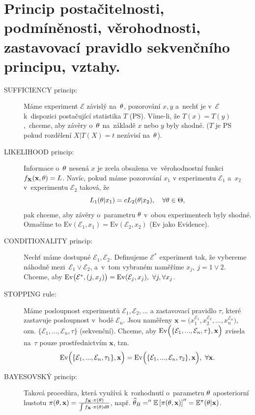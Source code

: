 \chapter{Princip postačitelnosti, podmíněnosti, věrohodnosti, zastavovací pravidlo sekvenčního principu, vztahy.}
\begin{description}
	\item[SUFFICIENCY princip:] Máme experiment $\mathcal{E}$ závislý na~$\theta$, pozorování $x,y$ a~nechť je v~$\mathcal{E}$ k~dispozici postačující statistika $T$ (PS). Víme-li, že $T(x)=T(y)$,~chceme, aby závěry o~$\theta$ na~základě $x$ nebo $y$ byly shodné. ($T$ je PS pokud rozdělení $X|T(X)=t$ nezávisí na~$\theta$).
	
	\item[LIKELIHOOD princip:] Informace o~$\theta$ nesená $x$ je zcela obsažena ve~věrohodnostní funkci $f_{\textbf{X}}(\textbf{x},\theta)=L$. Navíc, pokud máme pozorování $x_1$ v experimentu $\mathcal{E}_1$ a~$x_2$ v~experimentu $\mathcal{E}_2$ taková, že 
	$$ L_1(\theta|x_1)=c L_2(\theta|x_2),\quad\forall\theta\in\Theta,$$
	pak chceme, aby závěry o~parametru $\theta$ v~obou experimentech byly shodné. Označíme to $\mathrm{Ev}(\mathcal{E}_1,x_1)=\mathrm{Ev}(\mathcal{E}_2,x_2)$ (Ev jako Evidence). 
	\item[CONDITIONALITY princip:] Nechť máme dostupné $\mathcal{E}_1,\mathcal{E}_2$. Definujeme $\mathcal{E}^*$ experiment tak, že vybereme náhodně mezi~$\mathcal{E}_1 \vee \mathcal{E}_2$, a~v~tom vybraném naměříme $x_j,~j=1\vee 2$. Chceme, aby $\mathrm{Ev}\big(\mathcal{E}^*,(j,x_j)\big)=\mathrm{Ev}(\mathcal{E}_j,x_j),~\forall j,\forall x_j$.
	\item[STOPPING rule:] Máme posloupnost experimentů $\mathcal{E}_1,\mathcal{E}_2,...$ a zastavovací pravidlo $\tau$, které zastavuje posloupnost v~bodě $\mathcal{E}_n$. Jsou naměřeny $\textbf{x}=\Big( x_1^{\mathcal{E}_1},x_2^{\mathcal{E}_2},...,x_n^{\mathcal{E}_n} \Big)$, ozn. $\{ \mathcal{E}_1,...,\mathcal{E}_n,\tau \}$ (sekvenční). Chceme, aby $\mathrm{Ev}\Big( \{ \mathcal{E}_1,...,\mathcal{E}_n,\tau \},\textbf{x} \Big)$ zvisela na~$\tau$ pouze prostřednictvím $\textbf{x}$, tzn. $$\mathrm{Ev}\Big( \{ \mathcal{E}_1,...,\mathcal{E}_n,\tau_1 \},\textbf{x} \Big)=\mathrm{Ev}\Big( \{ \mathcal{E}_1,...,\mathcal{E}_n,\tau_2 \},\textbf{x} \Big),~\forall \textbf{x}.$$
	\item[BAYESOVSKÝ princip:] Taková procedůra, která využívá k~rozhodnutí o~parametru $\theta$ aposteriorní hustotu $\pi(\theta,\textbf{x})=\frac{f_{\textbf{X}}\cdot\pi(\theta)}{\int f_{\textbf{X}}\cdot\pi(\theta) d\theta}$, např. $\widehat{\theta}_B=''\mathbb{E}\left[ \pi(\theta,\textbf{x}) \right]''=\mathbb{E}^\pi(\theta|\textbf{x})$.
\end{description}

